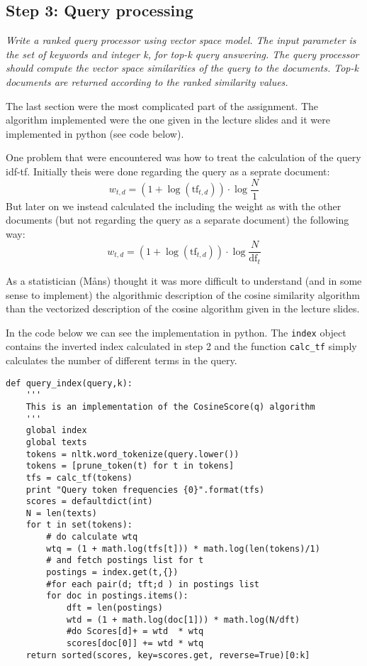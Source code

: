 \documentclass[a4paper]{article}
\begin{document}
\subsection{Step 3: Query processing}
\textit{Write a ranked query processor using vector space model. The input parameter is the set of keywords and integer k, for top-k query answering. The query processor should compute the vector space similarities of the query to the documents. Top-k documents are returned according to the ranked similarity values.}

The last section were the most complicated part of the assignment. The
algorithm implemented were the one given in the lecture slides and it
were implemented in python (see code below).

One problem that were encountered was how to treat the calculation of
the query idf-tf. Initially theis were done regarding the query as a
seprate document:
\[
w_{t,d}=(1+\log(\mbox{tf}_{t,d}))\cdot\log\frac{N}{1}
\]
But later on we instead calculated the including the weight as with
the other documents (but not regarding the query as a separate
document) the following way:
\[
w_{t,d}=(1+\log(\mbox{tf}_{t,d}))\cdot\log\frac{N}{\mbox{df}_{t}}
\]

As a statistician (Måns) thought it was more difficult to understand
(and in some sense to implement) the
algorithmic description of the cosine similarity algorithm than the
vectorized description of the cosine algorithm given in the lecture
slides.

In the code below we can see the implementation in python. The
\texttt{index} object contains the inverted index calculated in step 2
and the function \texttt{calc_tf} simply calculates the number of
different terms in the query.

\begin{verbatim}
def query_index(query,k):
    '''
    This is an implementation of the CosineScore(q) algorithm
    '''
    global index
    global texts
    tokens = nltk.word_tokenize(query.lower())
    tokens = [prune_token(t) for t in tokens]
    tfs = calc_tf(tokens)
    print "Query token frequencies {0}".format(tfs)
    scores = defaultdict(int)
    N = len(texts)
    for t in set(tokens):
        # do calculate wtq
        wtq = (1 + math.log(tfs[t])) * math.log(len(tokens)/1) 
        # and fetch postings list for t 
        postings = index.get(t,{})
        #for each pair(d; tft;d ) in postings list
        for doc in postings.items():
            dft = len(postings)
            wtd = (1 + math.log(doc[1])) * math.log(N/dft)
            #do Scores[d]+ = wtd  * wtq
            scores[doc[0]] += wtd * wtq
    return sorted(scores, key=scores.get, reverse=True)[0:k]
\end{verbatim}
\end{document}
